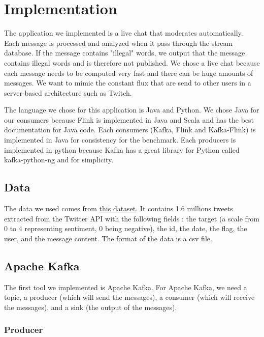 \documentclass[utf8,9pt]{extarticle}
\begin{document}
\section{Implementation}
\hspace{2 mm} The application we implemented is a live chat that moderates automatically. Each message is processed and analyzed when it pass through the stream database. If the message contains "illegal" words, we output that the message contains illegal words and is therefore not published. We chose a live chat because each message needs to be computed very fast and there can be huge amounts of messages. We want to mimic the constant flux that are send to other users in a server-based architecture such as Twitch. 

The language we chose for this application is Java and Python. We chose Java for our consumers because Flink is implemented in Java and Scala and has the best documentation for Java code. Each consumers (Kafka, Flink and Kafka-Flink) is implemented in Java for consistency for the benchmark. Each producers is implemented in python because Kafka has a great library for Python called kafka-python-ng and for simplicity. 


\subsection{Data}

\hspace{2 mm} The data we used comes from \href{https://www.kaggle.com/datasets/kazanova/sentiment140}{this dataset}. It contains 1.6 millions tweets extracted from the Twitter API with the following fields : the target (a scale from 0 to 4 representing sentiment, 0 being negative), the id, the date, the flag, the user, and the message content. The format of the data is a csv file.

\subsection{Apache Kafka}

\hspace{2 mm} The first tool we implemented is Apache Kafka. For Apache Kafka, we need a topic, a producer (which will send the messages), a consumer (which will receive the messages), and a sink (the output of the messages).

\subsubsection{Producer}
\end{document}
